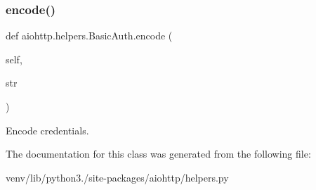 \subsubsection{\texorpdfstring{encode()}{encode()}}
{\footnotesize\ttfamily def aiohttp.\+helpers.\+Basic\+Auth.\+encode (\begin{DoxyParamCaption}\item[{}]{self,  }\item[{}]{str }\end{DoxyParamCaption})}

\begin{DoxyVerb}Encode credentials.\end{DoxyVerb}
 

The documentation for this class was generated from the following file\+:\begin{DoxyCompactItemize}
\item 
venv/lib/python3./site-\/packages/aiohttp/helpers.\+py\end{DoxyCompactItemize}
